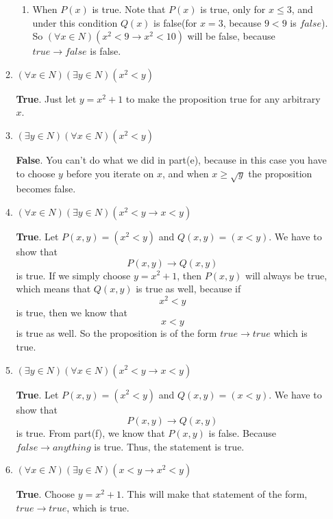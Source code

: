 \documentclass[11pt]{article}
\begin{document}
\begin{enumerate}
\begin{enumerate}
\begin{enumerate}
				\item When $P(x)$ is true. Note that $P(x)$ is true, only for $x \le 3$, and under this condition $Q(x)$ is false(for $x = 3$, because $9 < 9$ is $false$). So $(\forall x \in N)(x^2 < 9 \rightarrow x^2 < 10) $ will be false, because $true \rightarrow false$ is false. 
			\end{enumerate}
			
			
			\item $(\forall x \in N)(\exists y \in N)(x^2 < y)$
			
			\textbf{True}. Just let $y = x^2 + 1$ to make the proposition true for any arbitrary $x$. \\
			
			\item $(\exists y \in N)(\forall x \in N)(x^2 < y)$
			
			\textbf{False}. You can't do what we did in part(e), because in this case you have to choose $y$ before you iterate on $x$, and when $x \ge \sqrt{y}$ the proposition becomes false. \\
			
			\item $(\forall x \in N)(\exists y \in N) (x^2 < y \rightarrow x < y)$
			
			\textbf{True}. Let $P(x, y) = (x^2 < y)$ and $Q(x, y) = (x < y)$. We have to show that $$P(x, y) \rightarrow Q(x, y)$$ is true. If we simply choose $y = x^2 + 1$, then $P(x, y)$ will always be true, which means that $Q(x, y)$ is true as well, because if $$x^2 < y$$ is true, then we know that $$x < y$$
			is true as well. So the proposition is of the form $true \rightarrow true$ which is true. 
			
			\item $(\exists y \in N)(\forall x \in N) (x^2 < y \rightarrow x < y)$
			
			\textbf{True}. Let $P(x, y) = (x^2 < y)$ and $Q(x, y) = (x < y)$. We have to show that $$P(x, y) \rightarrow Q(x, y)$$ is true. From part(f), we know that $P(x, y)$ is false. Because $false \rightarrow anything$ is true. Thus, the statement is true. \\
			
			\item $(\forall x \in N)(\exists y \in N) (x < y \rightarrow x^2 < y)$
			
			\textbf{True}. Choose $y = x^2 + 1$. This will make that statement of the form, $true \rightarrow true$, which is true. \\
			

\end{enumerate}
\end{enumerate}
\end{document}

